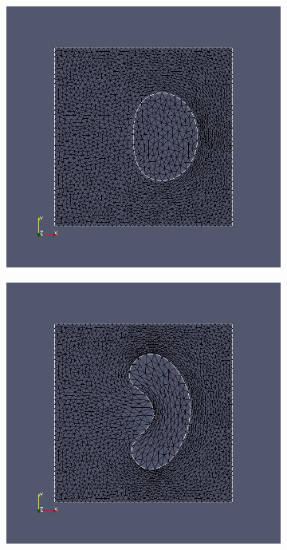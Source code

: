 \begin{figure}
	\begin{subfigure}{0.3\textwidth}
	\centering
	\includegraphics[scale=0.2]{pic_brokendonut_bfgs_konstlame_6.jpg}
	\caption{}	
	\end{subfigure}
	\begin{subfigure}{0.3\textwidth}
	\centering
	\includegraphics[scale=0.2]{pic_brokendonut_bfgs_konstlame_12.jpg}

\end{subfigure}
\end{figure}
